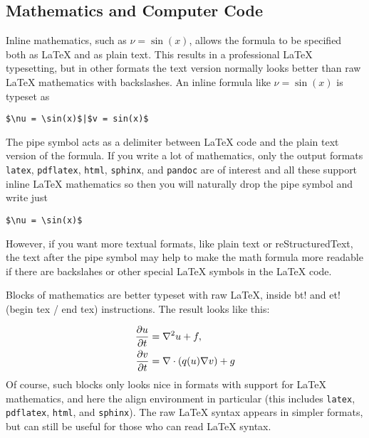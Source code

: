 \documentclass[%
oneside,                 %
final,                   %
10pt]{article}
\begin{document}
\noindent

\subsection{Mathematics and Computer Code}

Inline mathematics, such as $\nu = \sin(x)$,
allows the formula to be specified both as {\LaTeX} and as plain text.
This results in a professional {\LaTeX} typesetting, but in other formats
the text version normally looks better than raw {\LaTeX} mathematics with
backslashes. An inline formula like $\nu = \sin(x)$ is
typeset as

\begin{Verbatim}[fontsize=\fontsize{9pt}{9pt},tabsize=8,baselinestretch=0.85,
fontfamily=tt,xleftmargin=7mm]
$\nu = \sin(x)$|$v = sin(x)$
\end{Verbatim}
\noindent
The pipe symbol acts as a delimiter between {\LaTeX} code and the plain text
version of the formula. If you write a lot of mathematics, only the
output formats {\fontsize{10pt}{10pt}\Verb!latex!}, {\fontsize{10pt}{10pt}\Verb!pdflatex!}, {\fontsize{10pt}{10pt}\Verb!html!}, {\fontsize{10pt}{10pt}\Verb!sphinx!}, and {\fontsize{10pt}{10pt}\Verb!pandoc!}
are of interest
and all these support inline {\LaTeX} mathematics so then you will naturally
drop the pipe symbol and write just

\begin{Verbatim}[fontsize=\fontsize{9pt}{9pt},tabsize=8,baselinestretch=0.85,
fontfamily=tt,xleftmargin=7mm]
$\nu = \sin(x)$
\end{Verbatim}
\noindent
However, if you want more textual formats, like plain text or reStructuredText,
the text after the pipe symbol may help to make the math formula more readable
if there are backslahes or other special {\LaTeX} symbols in the {\LaTeX} code.

Blocks of mathematics are better typeset with raw {\LaTeX}, inside
{\fontsize{10pt}{10pt}\Verb!!bt!} and {\fontsize{10pt}{10pt}\Verb!!et!} (begin tex / end tex) instructions.
The result looks like this:

\begin{align}
{\partial u\over\partial t} &= \nabla^2 u + f, \label{myeq1}\\
{\partial v\over\partial t} &= \nabla\cdot(q(u)\nabla v) + g
\end{align}
Of course, such blocks only looks nice in formats with support
for {\LaTeX} mathematics, and here the align environment in particular
(this includes {\fontsize{10pt}{10pt}\Verb!latex!}, {\fontsize{10pt}{10pt}\Verb!pdflatex!}, {\fontsize{10pt}{10pt}\Verb!html!}, and {\fontsize{10pt}{10pt}\Verb!sphinx!}). The raw
{\LaTeX} syntax appears in simpler formats, but can still be useful
for those who can read {\LaTeX} syntax.
\end{document}
